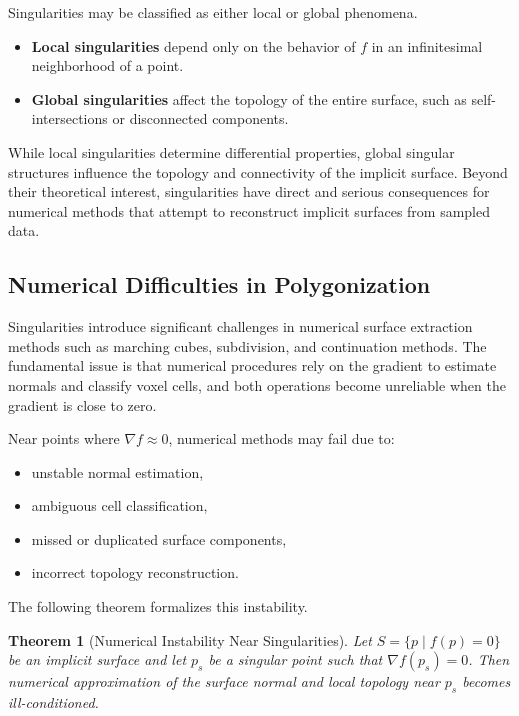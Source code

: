 \documentclass[12pt, a4paper, oneside]{book}
\theoremstyle{plain}
\newtheorem{theorem}{Theorem}[chapter]
\theoremstyle{definition}
\theoremstyle{remark}
\theoremstyle{definition}
\begin{document}
Singularities may be classified as either local or global phenomena.

\begin{itemize}
    \item \textbf{Local singularities} depend only on the behavior of $f$ in an
          infinitesimal neighborhood of a point.
    \item \textbf{Global singularities} affect the topology of the entire surface, such
          as self-intersections or disconnected components.
\end{itemize}

While local singularities determine differential properties, global singular structures
influence the topology and connectivity of the implicit surface. Beyond their theoretical
interest, singularities have direct and serious consequences for numerical methods that
attempt to reconstruct implicit surfaces from sampled data.

\subsection{Numerical Difficulties in Polygonization}

Singularities introduce significant challenges in numerical surface extraction methods
such as marching cubes, subdivision, and continuation methods. The fundamental issue is
that numerical procedures rely on the gradient to estimate normals and classify voxel
cells, and both operations become unreliable when the gradient is close to zero.

Near points where $\nabla f \approx 0$, numerical methods may fail due to:
\begin{itemize}
    \item unstable normal estimation,
    \item ambiguous cell classification,
    \item missed or duplicated surface components,
    \item incorrect topology reconstruction.
\end{itemize}

The following theorem formalizes this instability.

\begin{theorem}[Numerical Instability Near Singularities]
Let $S = \{p \mid f(p)=0\}$ be an implicit surface and let $p_s$ be a singular point
such that $\nabla f(p_s)=0$. Then numerical approximation of the surface normal and local
topology near $p_s$ becomes ill-conditioned.
\end{theorem}
\end{document}
